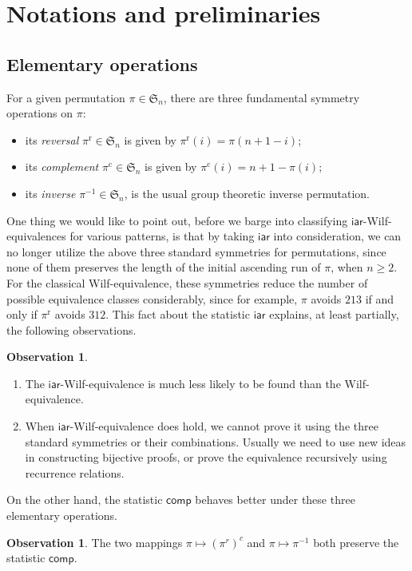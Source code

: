 \documentclass[12pt]{amsart}
\numberwithin{equation}{section}
\theoremstyle{plain}
\theoremstyle{definition}
\newtheorem{Observation}[theorem]{Observation}
\def\S{\mathfrak{S}}
\def\iar{\mathsf{iar}}
\def\comp{\mathsf{comp}}
\begin{document}
\section{Notations and preliminaries}\label{sec:notation}

\subsection{Elementary operations}
For a given permutation $\pi\in\S_n$, there are three fundamental symmetry operations on $\pi$:
\begin{itemize}
\item its {\em reversal} $\pi^{\mathrm{r}}\in\S_n$ is given by $\pi^{\mathrm{r}}(i)=\pi(n+1-i)$;
\item its {\em complement} $\pi^{\mathrm{c}}\in\S_n$ is given by $\pi^{\mathrm{c}}(i)=n+1-\pi(i)$; 
\item its {\em inverse} $\pi^{-1}\in\S_n$, is the usual group theoretic inverse permutation. 
\end{itemize}
One thing we would like to point out, before we barge into classifying $\iar$-Wilf-equivalences for various patterns, is that by taking $\iar$ into consideration, we can no longer utilize the above three standard symmetries for permutations, since none of them preserves the length of the initial ascending run of $\pi$, when $n\ge 2$.  For the classical Wilf-equivalence, these symmetries reduce the number of possible equivalence classes considerably, since for example, $\pi$ avoids $213$ if and only if $\pi^{\mathrm{r}}$ avoids $312$. This fact about the statistic $\iar$ explains, at least partially, the following observations. 

\begin{Observation}\hfill
\begin{enumerate}
	\item The $\iar$-Wilf-equivalence is much less likely to be found than the Wilf-equivalence. 
	
	\item When $\iar$-Wilf-equivalence does hold, we cannot prove it using the three standard symmetries or their combinations. Usually we need to use new ideas in constructing bijective proofs, or prove the equivalence recursively using recurrence relations.
\end{enumerate}
\end{Observation}

On the other hand, the statistic $\comp$ behaves better under these three elementary operations. 
\begin{Observation}\label{obs:2}
The two mappings $\pi\mapsto (\pi^r)^c$ and $\pi\mapsto \pi^{-1}$ both preserve the statistic $\comp$. 
\end{Observation}
\end{document}
